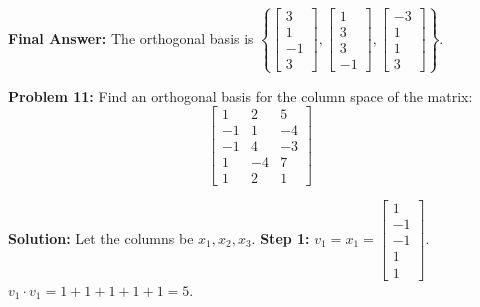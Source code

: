 \documentclass[11pt, letterpaper]{article}
\theoremstyle{definition}
\theoremstyle{remark}
\begin{document}
\textbf{Final Answer:} The orthogonal basis is $\left\{ \begin{bmatrix} 3 \\ 1 \\ -1 \\ 3 \end{bmatrix}, \begin{bmatrix} 1 \\ 3 \\ 3 \\ -1 \end{bmatrix}, \begin{bmatrix} -3 \\ 1 \\ 1 \\ 3 \end{bmatrix} \right\}$.

\vspace{1em}
\textbf{Problem 11:} 
Find an orthogonal basis for the column space of the matrix:
\[ \begin{bmatrix} 1 & 2 & 5 \\ -1 & 1 & -4 \\ -1 & 4 & -3 \\ 1 & -4 & 7 \\ 1 & 2 & 1 \end{bmatrix} \]

\textbf{Solution:}
Let the columns be $x_1, x_2, x_3$.
\textbf{Step 1:} $v_1 = x_1 = \begin{bmatrix} 1 \\ -1 \\ -1 \\ 1 \\ 1 \end{bmatrix}$. $v_1 \cdot v_1 = 1 + 1 + 1 + 1 + 1 = 5$.
\end{document}

